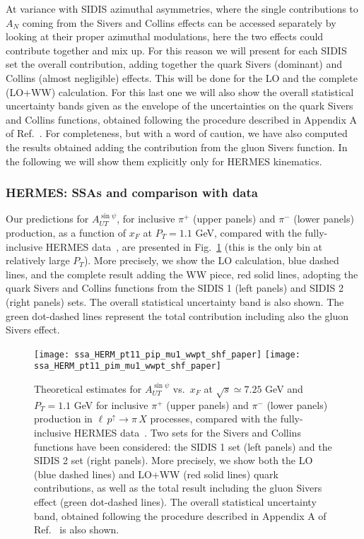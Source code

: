 \documentclass[nofootinbib,superscriptaddress,aps]{revtex4}
\newcommand{\pup}{p^\uparrow}
\begin{document}
At variance with SIDIS azimuthal asymmetries, where the single contributions to $A_N$ coming from the Sivers and Collins effects can be accessed separately by looking at their proper azimuthal modulations, here the two effects could contribute together and mix up. For this reason we will present for each SIDIS set the overall contribution, adding together the quark Sivers (dominant) and Collins (almost negligible) effects. This will be done for the LO and the complete (LO+WW) calculation. For this last one we will also show the overall statistical uncertainty bands given as the envelope of the uncertainties on the quark Sivers and Collins functions, obtained following the procedure described in Appendix A of Ref.~\cite{Anselmino:2008sga}. For completeness, but with a word of caution, we have also computed the results obtained adding the contribution from the gluon Sivers function. In the following we will show them explicitly only for HERMES kinematics.

\subsubsection{HERMES: SSAs and comparison with data}

Our predictions for $A_{UT}^{\sin\psi}$, for inclusive $\pi^+$ (upper panels) and $\pi^-$ (lower panels) production, as a function of $x_F$ at $P_T = 1.1$ GeV, compared with the fully-inclusive HERMES data~\cite{Airapetian:2013bim}, are presented in Fig.~\ref{fig:SSA-pi-pt11} (this is the only bin at relatively large $P_T$). More precisely, we show the LO calculation, blue dashed lines, and the complete result adding the WW piece, red solid lines, adopting the quark Sivers and Collins functions from the SIDIS 1 (left panels) and SIDIS 2 (right panels) sets. The overall statistical uncertainty band is also shown. The green dot-dashed lines represent the total contribution including also the gluon Sivers effect.

\begin{figure}[ht!]
 \centering
 \texttt{[image: ssa\_HERM\_pt11\_pip\_mu1\_wwpt\_shf\_paper]}
 \texttt{[image: ssa\_HERM\_pt11\_pim\_mu1\_wwpt\_shf\_paper]}
 \caption{Theoretical estimates for $A_{UT}^{\sin\psi}$ vs.~$x_F$ at $\sqrt{s}\simeq 7.25$ GeV and $P_T = 1.1$ GeV for inclusive $\pi^+$ (upper panels) and $\pi^-$ (lower panels) production in $\ell \, \pup \to \pi \, X$ processes, compared with the fully-inclusive HERMES data~\cite{Airapetian:2013bim}. Two sets for the Sivers and Collins functions have been considered: the SIDIS 1 set (left panels) and the SIDIS 2 set (right panels). More precisely, we show both the LO (blue dashed lines) and LO+WW (red solid lines) quark contributions, as well as the total result including the gluon Sivers effect (green dot-dashed lines). The overall statistical uncertainty band, obtained following the procedure described in Appendix A of Ref.~\cite{Anselmino:2008sga} is also shown.
}
  \label{fig:SSA-pi-pt11}
\end{figure}
\end{document}
